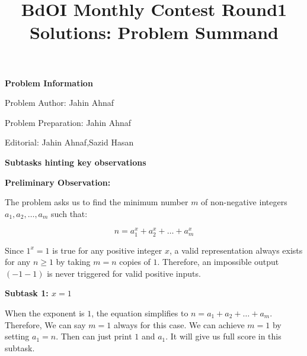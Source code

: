 \documentclass[12pt]{article}
\title{BdOI Monthly Contest  Round1 Solutions: Problem
Summand}
\date{} %
\begin{document}
\maketitle


\vspace{0.3cm}

\textbf{\Large Problem Information}

\vspace{0.3cm}

{\large Problem Author: Jahin Ahnaf}

\vspace{0.3cm}

{\large Problem Preparation: Jahin Ahnaf}

\vspace{0.3cm}

{\large Editorial: Jahin Ahnaf,Sazid Hasan}

\vspace{0.3cm}



\vspace{0.5cm}

\textbf{\Large Subtasks hinting key observations}

\vspace{0.3cm}

\textbf{\large Preliminary Observation:}
\vspace{0.3cm}

The problem asks us to find the minimum number $m$ of non-negative integers $a_1, a_2, \dots, a_m$ such that:

$$n = a_1^x + a_2^x + \dots + a_m^x$$

Since $1^x = 1$ is true for any positive integer $x$, a valid representation always exists for any $n \ge 1$  by taking $m = n$ copies of $1$. Therefore, an impossible output $(-1 -1)$ is never triggered for valid positive inputs. 







\vspace{0.3cm}

\textbf{\large Subtask 1: $x=1$}

\vspace{0.3cm}

When the exponent is $1$, the equation simplifies to $n = a_1 + a_2 + \dots + a_m$. Therefore, We can say $m=1$ always for this case.   We can  achieve $m = 1$ by setting $a_1 = n$. Then can just print $1$ and $a_1$. It will give us full score in this subtask. 
\end{document}

